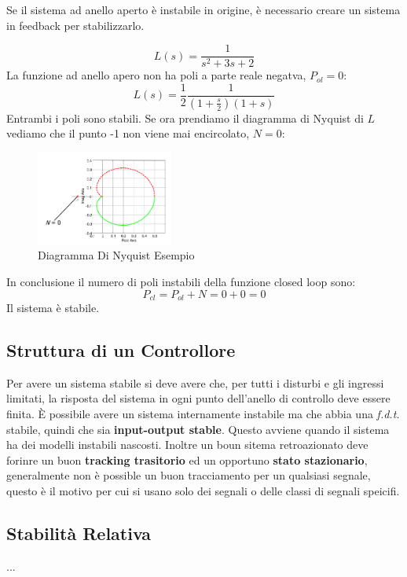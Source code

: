 \documentclass[12pt]{article}
\begin{document}
Se il sistema ad anello aperto \`e instabile in origine, \`e necessario creare un sistema in feedback per stabilizzarlo.

\begin{example}{}{}
    \[ L(s) = \frac{1}{s^{2} + 3s + 2}  \]
    La funzione ad anello apero non ha poli a parte reale negatva, $P _{ol} = 0$:
    \[ L(s) = \frac{1}{2} \frac{1}{\left( 1 + \frac{s}{2}  \right) \left( 1 + s \right)  }  \]
    Entrambi i poli sono stabili. Se ora prendiamo il diagramma di Nyquist di $L$ vediamo che il punto -1 non viene mai encircolato, $N = 0$:
    \begin{figure}[H]
        \centering
        \includegraphics[width=0.4\textwidth]{diagramma-di-nyquist-esempio.png}
        \caption{Diagramma Di Nyquist Esempio}
        \label{fig:diagramma-di-nyquist-esempio}
    \end{figure}
    In conclusione il numero di poli instabili della funzione closed loop sono:
    \[ P _{cl} = P _{ol} + N = 0 + 0 = 0 \]
    Il sistema \`e stabile.
\end{example}

\subsection{Struttura di un Controllore}
Per avere un sistema stabile si deve avere che, per tutti i disturbi e gli ingressi limitati, la risposta del sistema in ogni punto dell'anello di controllo deve essere finita. \`E possibile avere un sistema internamente instabile ma che abbia una \emph{f.d.t.} stabile, quindi che sia \textbf{input-output stable}. Questo avviene quando il sistema ha dei modelli instabili nascosti. Inoltre un boun sitema retroazionato deve forinre un buon \textbf{tracking trasitorio} ed un opportuno \textbf{stato stazionario}, generalmente non \`e possible un buon tracciamento per un qualsiasi segnale, questo \`e il motivo per cui si usano solo dei segnali o delle classi di segnali speicifi.

\subsection{Stabilit\`a Relativa}
...
\end{document}

